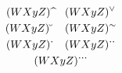 \documentclass{book}
\begin{document}
\begin{gather*}
(WXyZ)\sphat  \quad (WXyZ)\spcheck \\
(WXyZ)\spbreve\quad (WXyZ)\sptilde \\
(WXyZ)\spdot  \quad (WXyZ)\spddot \\
(WXyZ)\spdddot
\end{gather*}
\end{document}
